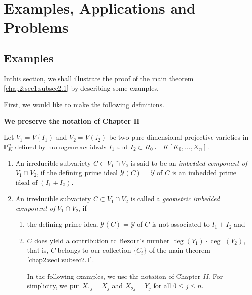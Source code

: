 \chapter{Examples, Applications and Problems}\label{chap3}%

\section{Examples}\label{chap3:sec1} %

 In\pageoriginale this section, we shall illustrate the proof of the
 main theorem \ref{chap2:sec1:subsec2.1} by describing some examples. 
  
 First, we would like to make the following definitions. 
 
\noindent \textbf{We preserve the notation of Chapter II}
 

\begin{definition}
  Let $V_1 = V(I_1)$ and $V_2 = V(I_2)$ be two pure dimensional
  projective varieties in $\mathbb{P}^n_K$ defined by homogeneous ideals
  $I_1$ and $I_2\subset R_0 \coloneqq K[K_0,\ldots,X_n]$. 
  
  \begin{enumerate}[\rm (a)]
  \item An irreducible subvariety $C\subset V_1 \cap V_2$ is said to be an
    \textit{imbedded component of} $V_1 \cap V_2$, if the defining prime
    ideal $\mathscr{Y}(C) = \mathscr{Y}$ of $C$ is an imbedded prime ideal
    of $(I_1+I_2)$.  
  \item An irreducible subvariety $C\subset V_1 \cap V_2$ is called
    a \textit{geometric imbedded component of} $V_1 \cap V_2$, if  
    \begin{enumerate}[\rm (i)]
    \item the defining prime ideal $\mathscr{Y}(C) = \mathscr{Y}$ of
      $C$ is not associated to $I_1 + I_2$ and 
    \item $C$ does yield a contribution to Bezout's number $\deg
      (V_1)\cdot\deg$ $(V_2)$, that is, $C$ belongs to our collection $\{
      C_i\}$ of the main theorem \ref{chap2:sec1:subsec2.1}. 
   
      In the following examples, we use the notation of Chapter
      $II$. For simplicity, we put $X_{1j} = X_j$ and $X_{2j} = Y_j$
      for all $0 \leq j \leq n$. 
  \end{enumerate}
\end{enumerate}
\end{definition}

